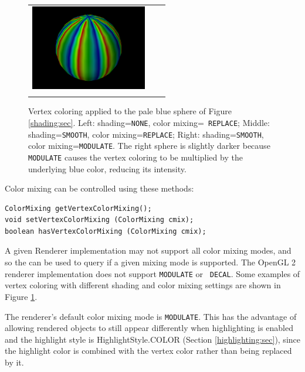 \begin{figure}[ht]
\begin{center}
\begin{tabular}{ccc}
         \includegraphics[width=2in]{images/coloredVerticesModulated}\\
      \fi
   \end{tabular}
\end{center}
\caption{Vertex coloring applied to the pale blue sphere of Figure
\ref{shading:sec}.  Left: shading={\tt NONE}, color mixing={\tt
REPLACE}; Middle: shading={\tt SMOOTH}, color mixing={\tt REPLACE};
Right: shading={\tt SMOOTH}, color mixing={\tt MODULATE}. The right
sphere is slightly darker because {\tt MODULATE} causes the vertex
coloring to be multiplied by the underlying blue color, reducing its
intensity.}
\label{vertexColoring:fig}
\end{figure}

Color mixing can be controlled using these methods:
%
\begin{lstlisting}[]
ColorMixing getVertexColorMixing();
void setVertexColorMixing (ColorMixing cmix); 
boolean hasVertexColorMixing (ColorMixing cmix);
\end{lstlisting}
%
A given Renderer implementation may not support all color mixing
modes, and so the
 can be
used to query if a given mixing mode is supported.  The OpenGL 2
renderer implementation does not support {\tt MODULATE} or {\tt
DECAL}. Some examples of vertex coloring with different shading
and color mixing settings
are shown in Figure \ref{vertexColoring:fig}.

\begin{sideblock}
The renderer's default color mixing mode is {\tt MODULATE}. This has
the advantage of allowing rendered objects to still appear differently
when highlighting is enabled and the highlight style is
%
{HighlightStyle.COLOR} (Section \ref{highlighting:sec}), since the
highlight color is combined with the vertex color rather than being
replaced by it.
\end{sideblock}


